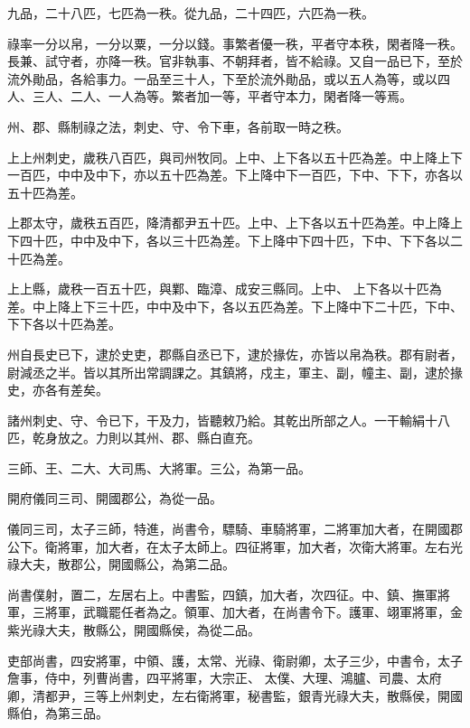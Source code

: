 \begin{pinyinscope}
 九品，二十八匹，七匹為一秩。從九品，二十四匹，六匹為一秩。



 祿率一分以帛，一分以粟，一分以錢。事繁者優一秩，平者守本秩，閑者降一秩。長兼、試守者，亦降一秩。官非執事、不朝拜者，皆不給祿。又自一品已下，至於流外勛品，各給事力。一品至三十人，下至於流外勛品，或以五人為等，或以四人、三人、二人、一人為等。繁者加一等，平者守本力，閑者降一等焉。



 州、郡、縣制祿之法，刺史、守、令下車，各前取一時之秩。



 上上州刺史，歲秩八百匹，與司州牧同。上中、上下各以五十匹為差。中上降上下一百匹，中中及中下，亦以五十匹為差。下上降中下一百匹，下中、下下，亦各以五十匹為差。



 上郡太守，歲秩五百匹，降清都尹五十匹。上中、上下各以五十匹為差。中上降上下四十匹，中中及中下，各以三十匹為差。下上降中下四十匹，下中、下下各以二十匹為差。



 上上縣，歲秩一百五十匹，與鄴、臨漳、成安三縣同。上中、
 上下各以十匹為差。中上降上下三十匹，中中及中下，各以五匹為差。下上降中下二十匹，下中、下下各以十匹為差。



 州自長史已下，逮於史吏，郡縣自丞已下，逮於掾佐，亦皆以帛為秩。郡有尉者，尉減丞之半。皆以其所出常調課之。其鎮將，戍主，軍主、副，幢主、副，逮於掾史，亦各有差矣。



 諸州刺史、守、令已下，干及力，皆聽敕乃給。其乾出所部之人。一干輸絹十八匹，乾身放之。力則以其州、郡、縣白直充。



 三師、王、二大、大司馬、大將軍。三公，為第一品。



 開府儀同三司、開國郡公，為從一品。



 儀同三司，太子三師，特進，尚書令，驃騎、車騎將軍，二將軍加大者，在開國郡公下。衛將軍，加大者，在太子太師上。四征將軍，加大者，次衛大將軍。左右光祿大夫，散郡公，開國縣公，為第二品。



 尚書僕射，置二，左居右上。中書監，四鎮，加大者，次四征。中、鎮、撫軍將軍，三將軍，武職罷任者為之。領軍、加大者，在尚書令下。護軍、翊軍將軍，金紫光祿大夫，散縣公，開國縣侯，為從二品。



 吏部尚書，四安將軍，中領、護，太常、光祿、衛尉卿，太子三少，中書令，太子詹事，侍中，列曹尚書，四平將軍，大宗正、
 太僕、大理、鴻臚、司農、太府卿，清都尹，三等上州刺史，左右衛將軍，秘書監，銀青光祿大夫，散縣侯，開國縣伯，為第三品。




\end{pinyinscope}
